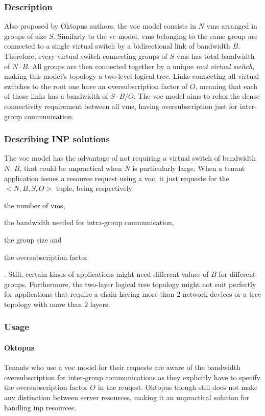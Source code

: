 
\subsubsection{Description}
Also proposed by Oktopus \cite{oktopus} authors, the \gls{voc} model consists in $N$ \glspl{vm} arranged in groups of size $S$.
Similarly to the \gls{vc} model, \glspl{vm} belonging to the same group are connected to a single virtual switch by a bidirectional link of bandwidth $B$.
Therefore, every virtual switch connecting groups of $S$ \glspl{vm} has total bandwidth of $N \cdot B$.
All groups are then connected together by a unique \textit{root virtual switch}, making this model's topology a two-level logical tree.
Links connecting all virtual switches to the root one have an oversubscription factor of $O$, meaning that each of those links has a bandwidth of $S \cdot B / O$.
The \gls{voc} model aims to relax the dense connectivity requirement between all \glspl{vm}, having oversubscription just for inter-group communication.

\subsubsection{Describing INP solutions}
The \gls{voc} model has the advantage of not requiring a virtual switch of bandwidth $N \cdot B$, that could be unpractical when $N$ is particularly large.
When a tenant application issues a resource request using a \gls{voc}, it just requests for the $<N, B, S, O>$ tuple, being respectively
\begin{mylist}
    \item the number of \glspl{vm},
    \item the bandwidth needed for intra-group communication,
    \item the group size and
    \item the oversubscription factor
\end{mylist}.
Still, certain kinds of applications might need different values of $B$ for different groups.
Furthermore, the two-layer logical tree topology might not suit perfectly for applications that require a chain having more than 2 network devices or a tree topology with more than 2 layers.

\subsubsection{Usage}
\paragraph{Oktopus \texorpdfstring{\cite{oktopus}}{}}
Tenants who use a \gls{voc} model for their requests are aware of the bandwidth oversubscription for inter-group communications as they explicitly have to specify the oversubscription factor $O$ in the reuqest.
Oktopus \cite{oktopus} though still does not make any distinction between server resources, making it an unpractical solution for handling \gls{inp} resources.
